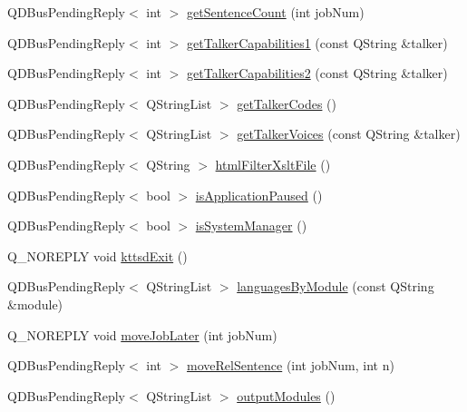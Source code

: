 \begin{DoxyCompactItemize}
\item 
Q\+D\+Bus\+Pending\+Reply$<$ int $>$ \hyperlink{classOrgKdeKSpeechInterface_a44014315f9bad17d6b448fda08242d4d}{get\+Sentence\+Count} (int job\+Num)
\item 
Q\+D\+Bus\+Pending\+Reply$<$ int $>$ \hyperlink{classOrgKdeKSpeechInterface_a671bc8ecfa69114dd7ac1af51d7baf09}{get\+Talker\+Capabilities1} (const Q\+String \&talker)
\item 
Q\+D\+Bus\+Pending\+Reply$<$ int $>$ \hyperlink{classOrgKdeKSpeechInterface_addfa35f87e3d40faca0aeae1c347b87b}{get\+Talker\+Capabilities2} (const Q\+String \&talker)
\item 
Q\+D\+Bus\+Pending\+Reply$<$ Q\+String\+List $>$ \hyperlink{classOrgKdeKSpeechInterface_ad6d8743c9f7d03ef31856ace6acaeb32}{get\+Talker\+Codes} ()
\item 
Q\+D\+Bus\+Pending\+Reply$<$ Q\+String\+List $>$ \hyperlink{classOrgKdeKSpeechInterface_a6212dfa7b44a7b87af1e6b19dab55802}{get\+Talker\+Voices} (const Q\+String \&talker)
\item 
Q\+D\+Bus\+Pending\+Reply$<$ Q\+String $>$ \hyperlink{classOrgKdeKSpeechInterface_acfd3d63167173567dfa892cc2366d346}{html\+Filter\+Xslt\+File} ()
\item 
Q\+D\+Bus\+Pending\+Reply$<$ bool $>$ \hyperlink{classOrgKdeKSpeechInterface_a3c9dc810b39efad5014181ea4491a5c5}{is\+Application\+Paused} ()
\item 
Q\+D\+Bus\+Pending\+Reply$<$ bool $>$ \hyperlink{classOrgKdeKSpeechInterface_a15613f721aa3e1fe1912b856fb700cd6}{is\+System\+Manager} ()
\item 
Q\+\_\+\+N\+O\+R\+E\+P\+L\+Y void \hyperlink{classOrgKdeKSpeechInterface_aed6d5125e73090f4992680b6f0751173}{kttsd\+Exit} ()
\item 
Q\+D\+Bus\+Pending\+Reply$<$ Q\+String\+List $>$ \hyperlink{classOrgKdeKSpeechInterface_ace1957f17c78047e8e3d67146b590d6e}{languages\+By\+Module} (const Q\+String \&module)
\item 
Q\+\_\+\+N\+O\+R\+E\+P\+L\+Y void \hyperlink{classOrgKdeKSpeechInterface_a7d45def6b77bc44faa749aa1ce6bc75a}{move\+Job\+Later} (int job\+Num)
\item 
Q\+D\+Bus\+Pending\+Reply$<$ int $>$ \hyperlink{classOrgKdeKSpeechInterface_a227ba17145438e3007c7dca6166e9124}{move\+Rel\+Sentence} (int job\+Num, int n)
\item 
Q\+D\+Bus\+Pending\+Reply$<$ Q\+String\+List $>$ \hyperlink{classOrgKdeKSpeechInterface_af0e7add59a969ab91bdc1499170ec824}{output\+Modules} ()
\item 

\end{DoxyCompactItemize}
